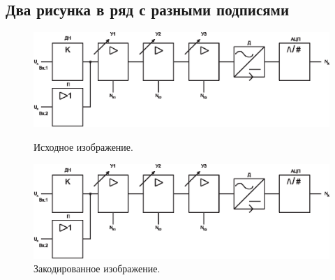 \newpage
\subsection{Два рисунка в ряд с разными подписями}


\begin{figure}[H]
\begin{center}
  \captionsetup{width=60mm}%
\begin{minipage}[h]{0.4\linewidth}
\includegraphics[width=1\linewidth]{./about/func_in}
\caption{Исходное изображение.} %
\label{ris:experimoriginal} %
\end{minipage}
\hfill
\begin{minipage}[h]{0.4\linewidth}
\includegraphics[width=1\linewidth]{./about/func_in}
\caption{Закодированное изображение.}
\label{ris:experimcoded}
\end{minipage}
\end{center}
\end{figure}



